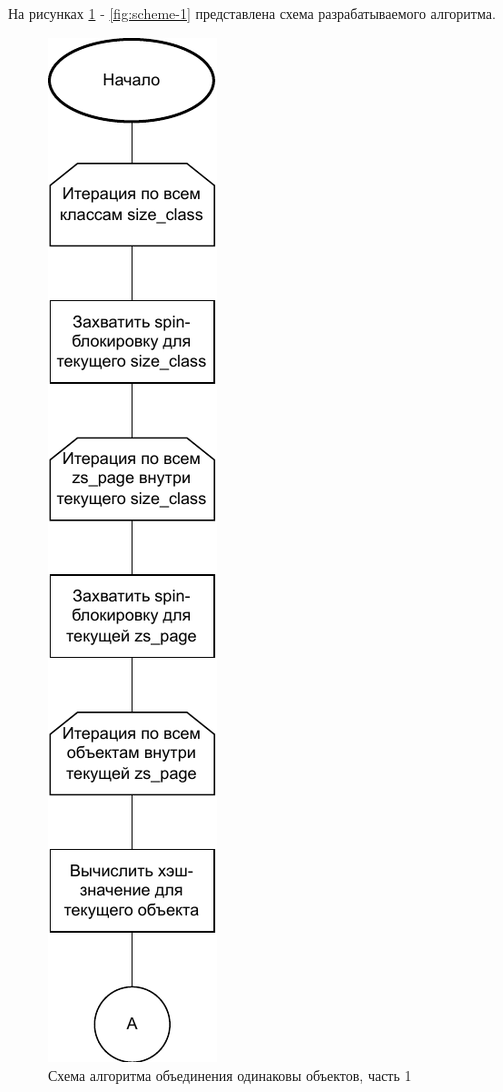 На рисунках \ref{fig:scheme-0} - \ref{fig:scheme-1} представлена схема разрабатываемого алгоритма.

\begin{figure}[h]
	\centering
	\includegraphics[scale=1.3]{img/scheme-0.pdf}
	\caption{Схема алгоритма объединения одинаковы объектов, часть 1}
	\label{fig:scheme-0}
\end{figure}

